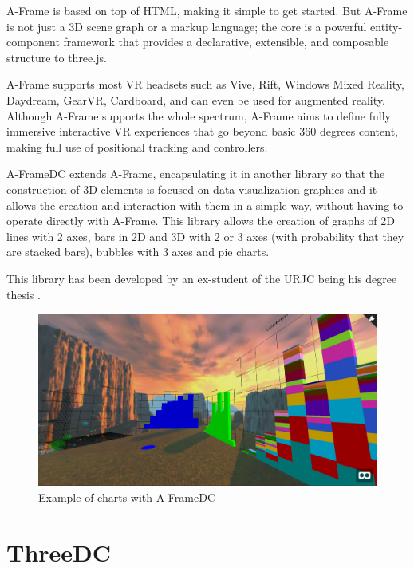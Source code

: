\documentclass[a4paper, 12pt]{book}
\begin{document}
A-Frame is based on top of HTML, making it simple to get started. But A-Frame is not just a 3D scene graph or a markup language; the core is a powerful entity-component framework that provides a declarative, extensible, and composable structure to three.js.

A-Frame supports most VR headsets such as Vive, Rift, Windows Mixed Reality, Daydream, GearVR, Cardboard, and can even be used for augmented reality. Although A-Frame supports the whole spectrum, A-Frame aims to define fully immersive interactive VR experiences that go beyond basic 360 degrees content, making full use of positional tracking and controllers.

A-FrameDC extends A-Frame, encapsulating it in another library so that the construction of 3D elements is focused on data visualization graphics and it allows the creation and interaction with them in a simple way, without having to operate directly with A-Frame. This library allows the creation of graphs of 2D lines with 2 axes, bars in 2D and 3D with 2 or 3 axes (with probability that they are stacked bars), bubbles with 3 axes and pie charts.

This library has been developed by an ex-student of the URJC being his degree thesis \cite{aframedcmemoria}.

\begin{figure}[H]
  \centering
  \includegraphics[width=16cm, keepaspectratio]{img/context/aframedc.png}
  \caption{Example of charts with A-FrameDC}
  \label{fig:pluginhtml}
\end{figure}



\section{ThreeDC}
\label{sec:threedc}
\end{document}
